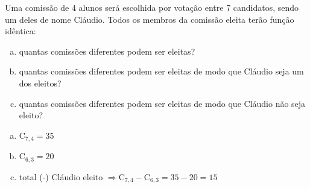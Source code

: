 \begin{ex}
Uma comissão de 4 alunos será escolhida por votação entre 7 candidatos, sendo um deles de nome Cláudio. Todos os membros da comissão eleita terão função idêntica:
   \begin{enumerate}[(a)]
   \item quantas comissões diferentes podem ser eleitas?
   \item quantas comissões diferentes podem ser eleitas de modo que Cláudio seja um dos eleitos?
   \item quantas comissões diferentes podem ser eleitas de modo que Cláudio não seja eleito?
     \end{enumerate} 
     \begin{sol}
      \phantom{A}
        \begin{enumerate} [(a)]
            \item $\mathrm{C}_{7,4}=35$
            \item $\mathrm{C}_{6,3}=20$
            \item total (-) Cláudio eleito \hspace{0,3cm} $\Longrightarrow\mathrm{C}_{7,4}-\mathrm{C}_{6,3}=35-20=15 $
        \end{enumerate}
     \end{sol}
\end{ex}